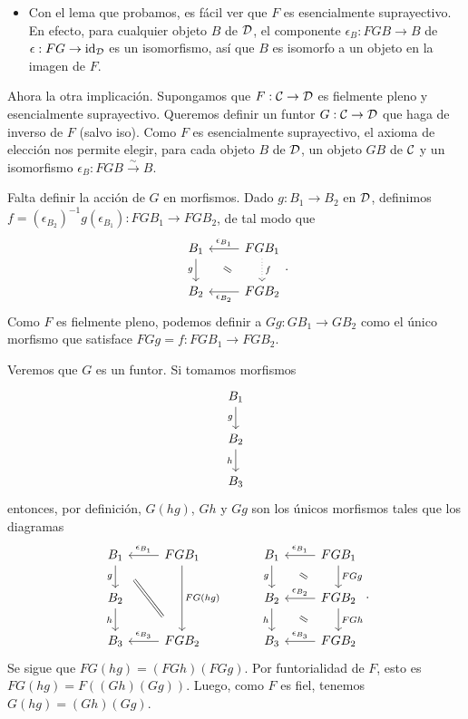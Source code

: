 \begin{sol}
\begin{itemize}
        \item
        Con el lema que probamos, es fácil ver que $F$ es
        esencialmente suprayectivo.
        En efecto, 
        para cualquier objeto $B$ de $\cal D$, el componente
        $\epsilon_B:FGB\to B$ de $\epsilon:FG\to\id_{\cal D}$ es un
        isomorfismo, así que $B$ es isomorfo a un objeto en la
        imagen de $F$.
    \end{itemize}
    Ahora la otra implicación.
    Supongamos que $F:\cal C\to\cal D$ es fielmente pleno
    y esencialmente suprayectivo.
    Queremos definir un funtor $G:\cal C\to \cal D$ que haga de
    inverso de $F$ (salvo iso).
    Como $F$ es esencialmente suprayectivo, el axioma de
    elección nos permite elegir, para cada objeto $B$ de $\cal D$,
    un objeto $GB$ de $\cal C$ y un isomorfismo
    $\epsilon_B:FGB\xrightarrow{\sim} B$.
    
    Falta definir la acción de $G$ en morfismos.
    Dado $g:B_1\to B_2$ en $\cal D$, definimos
    $f=(\epsilon_{B_2})^{-1}g(\epsilon_{B_1}):FGB_1\to FGB_2$, de tal
    modo que
    \[
        \begin{tikzcd}
            B_1 \ar[d,"g"']
            & FGB_1 \ar[l,"\epsilon_{B_1}"'] \ar[d,"f",dotted] \\
            B_2 & FGB_2 \ar[l,"\epsilon_{B_2}"]
            \com{1-1}{2-2}
        \end{tikzcd}
    .\]
    Como $F$ es fielmente pleno, podemos definir a $Gg:GB_1\to GB_2$
    como el único morfismo que satisface $FGg=f:FGB_1\to FGB_2$.
    
    Veremos que $G$ es un funtor.
    Si tomamos morfismos
    \[
        \begin{tikzcd}
            B_1 \ar[d,"g"'] \\
            B_2 \ar[d,"h"'] \\
            B_3
        \end{tikzcd}
    \]
    entonces, por definición, $G(hg)$, $Gh$ y $Gg$
    son los únicos morfismos tales que los diagramas
    \[
        \begin{tikzcd}
            B_1 \ar[d,"g"'] & FGB_1 \ar[l,"\epsilon_{B_1}"'] \ar[dd,"FG(hg)"] \\
            B_2 \ar[d,"h"'] \\
            B_3 & FGB_2 \ar[l,"\epsilon_{B_3}"']
            \com{1-1}{3-2}
        \end{tikzcd}
        \hspace{10mm}
        \begin{tikzcd}
            B_1 \ar[d,"g"'] & FGB_1 \ar[l,"\epsilon_{B_1}"'] \ar[d,"FGg"] \\
            B_2 \ar[d,"h"'] & FGB_2 \ar[l,"\epsilon_{B_2}"'] \ar[d,"FGh"] \\
            B_3 & FGB_2 \ar[l,"\epsilon_{B_3}"']
            \com{1-1}{2-2} \com{2-1}{3-2}
        \end{tikzcd}
    .\]
    Se sigue que $FG(hg)=(FGh)(FGg)$.
    Por funtorialidad de $F$, esto es $FG(hg)=F((Gh)(Gg))$.
    Luego, como $F$ es fiel, tenemos $G(hg)=(Gh)(Gg)$.
    

\end{sol}
